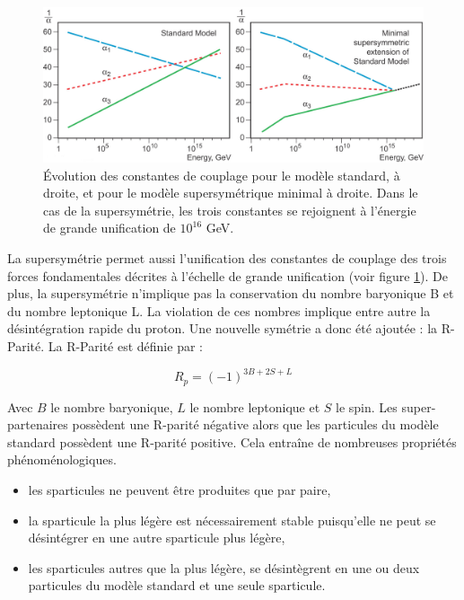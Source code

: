   \medskip
  
  \begin{figure}[!htb]
    \begin{center} 
      \includegraphics[scale=0.70]{./figures/constantes_couplage_MS_SUSY.jpg}
      \caption{\'Evolution des constantes de couplage pour le mod\`ele standard, à droite, et pour le mod\`ele supersym\'etrique minimal \`a droite. Dans le cas de la supersym\'etrie, les trois constantes se rejoignent \`a l'\'energie de grande unification de $10^{16}$ GeV. }
     \label{fig:constCouplages}
     \end{center}
  \end{figure}
  
  La supersymétrie permet aussi l'unification des constantes de couplage des trois forces fondamentales d\'ecrites \`a l'\'echelle de grande unification (voir figure \ref{fig:constCouplages}). De plus, la supersymétrie n'implique pas la conservation du nombre baryonique B et du nombre leptonique L. La violation de ces nombres implique entre autre la d\'esint\'egration rapide du proton. Une nouvelle sym\'etrie a donc \'et\'e ajout\'ee : la R-Parit\'e. La R-Parit\'e est d\'efinie par : 
  
  \begin{equation}
   R_p = (-1)^{3B+2S+L}
  \end{equation}

  Avec $B$ le nombre baryonique, $L$ le nombre leptonique et $S$ le spin. Les super-partenaires poss\`edent une R-parit\'e n\'egative alors que les particules du mod\`ele standard poss\`edent une R-parit\'e positive. Cela entraîne de nombreuses propri\'et\'es ph\'enom\'enologiques. 
  
  \medskip
  
  \renewcommand{\labelitemi}{$\bullet$}
  \begin{itemize}
   \item les sparticules ne peuvent \^etre produites que par paire,
   \item la sparticule la plus l\'eg\`ere est n\'ecessairement stable puisqu'elle ne peut se d\'esint\'egrer en une autre sparticule plus l\'eg\`ere,
    \item les sparticules autres que la plus l\'eg\`ere, se d\'esint\`egrent en une ou deux particules du mod\`ele standard et une seule sparticule.
  \end{itemize}

